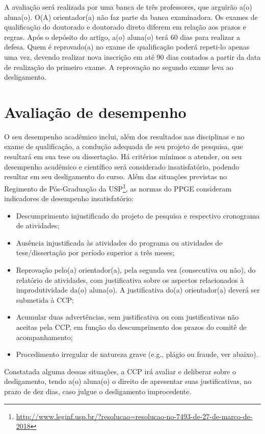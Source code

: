 A avaliação será realizada por uma banca de três professores, que
arguirão a(o) aluna(o). O(A) orientador(a) não faz parte da banca
examinadora. Os exames de qualificação do doutorado e doutorado direto
diferem em relação aos prazos e regras. Após o depósito do artigo, a(o) aluna(o) terá 60 dias para realizar a defesa.
Quem é reprovado(a) no
exame de qualificação poderá repeti-lo apenas uma vez, devendo
realizar nova inscrição em até 90 dias contados a partir da data de
realização do primeiro exame. A reprovação no segundo exame leva ao
desligamento.


\section{Avaliação de desempenho}
\label{sec:conduta}

O seu desempenho acadêmico inclui, além dos resultados nas disciplinas
e no exame de qualificação, a condução adequada de seu projeto de
pesquisa, que resultará em sua tese ou dissertação. Há critérios
mínimos a atender, ou seu desempenho acadêmico e científico será
considerado insatisfatório, podendo resultar em seu desligamento do
curso. Além das situações previstas no Regimento de Pós-Graduação da
USP\footnote{\url{http://www.leginf.usp.br/?resolucao=resolucao-no-7493-de-27-de-marco-de-2018}},
as normas do PPGE consideram indicadores de desempenho insatisfatório:

\begin{itemize}
\item Descumprimento injustificado do projeto de pesquisa e respectivo
  cronograma de atividades;
\item Ausência injustificada às atividades do programa ou atividades
  de tese/dissertação por período superior a três meses;
\item Reprovação pelo(a) orientador(a), pela segunda vez (consecutiva
  ou não), do relatório de atividades, com justificativa sobre os
  aspectos relacionados à improdutividade da(o) aluna(o). A
  justificativa do(a) orientador(a) deverá ser submetida à CCP;
\item Acumular duas advertências, sem justificativa ou com
  justificativas não aceitas pela CCP, em função do descumprimento dos
  prazos do comitê de acompanhamento;
\item Procedimento irregular de natureza grave (e.g., plágio ou fraude, ver abaixo).
\end{itemize}

Constatada alguma dessas situações, a CCP irá avaliar e deliberar
sobre o desligamento, tendo a(o) aluna(o) o direito de apresentar suas
justificativas, no prazo de dez dias, caso julgue o desligamento
improcedente.

